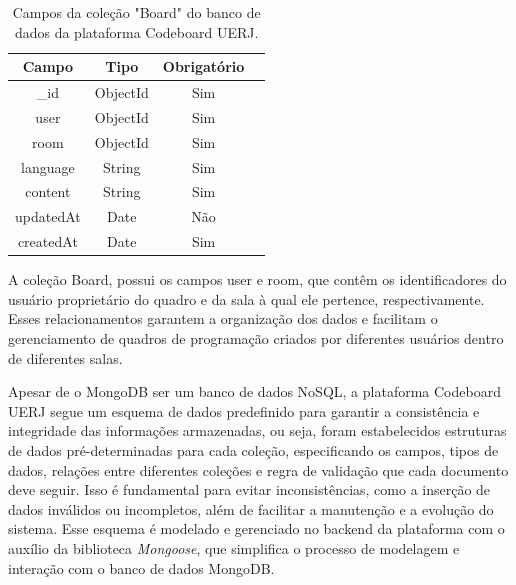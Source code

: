 \begin{table}[H]
    \centering
    \caption{Campos da coleção "Board" do banco de dados da plataforma Codeboard UERJ.}
    \label{tab:board-collection-fields}
    \renewcommand{\arraystretch}{1.3} 
    \begin{tabular}{|c|c|c|c|}
        \hline
        \textbf{Campo}             & \textbf{Tipo} & \textbf{Obrigatório} \\
        \hline
        \_id             & ObjectId      & Sim                  \\
        \hline
        user          & ObjectId      & Sim                  \\
        \hline
        room          & ObjectId      & Sim                  \\
        \hline
        language           & String        & Sim                  \\
        \hline
        content                 & String        & Sim                  \\
        \hline
        updatedAt         & Date          & Não                  \\
        \hline
        createdAt          & Date          & Sim                  \\
        \hline
    \end{tabular}
\end{table}

A coleção Board, possui os campos user e room, que contêm os identificadores do usuário proprietário do quadro e da sala à qual ele pertence, respectivamente. Esses relacionamentos garantem a organização dos dados e facilitam o gerenciamento de quadros de programação criados por diferentes usuários dentro de diferentes salas.

Apesar de o MongoDB ser um banco de dados NoSQL, a plataforma Codeboard UERJ segue um esquema de dados predefinido para garantir a consistência e integridade das informações armazenadas, ou seja, foram estabelecidos estruturas de dados pré-determinadas para cada coleção, especificando os campos, tipos de dados, relações entre diferentes coleções e regra de validação que cada documento deve seguir. Isso é fundamental para evitar inconsistências, como a inserção de dados inválidos ou incompletos, além de facilitar a manutenção e a evolução do sistema. Esse esquema é modelado e gerenciado no backend da plataforma com o auxílio da biblioteca \emph{Mongoose}, que simplifica o processo de modelagem e interação com o banco de dados MongoDB.


